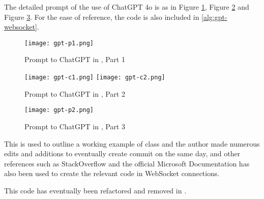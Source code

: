 The detailed prompt of the use of ChatGPT 4o \cite{gpt-websocket} is as in Figure \ref{fig:gpt-websocket-1}, Figure \ref{fig:gpt-websocket-2} and Figure \ref{fig:gpt-websocket-3}. For the ease of reference, the code is also included in \ref{alg:gpt-websocket}.

\begin{figure}[!ht]
    \centering

    \texttt{[image: gpt-p1.png]}
    \caption[Prompt to ChatGPT in \cite{gpt-websocket}, Part 1]{Prompt to ChatGPT in \cite{gpt-websocket}, Part 1}
    \label{fig:gpt-websocket-1}
\end{figure}

\begin{figure}[!ht]
    \centering

    \texttt{[image: gpt-c1.png]}
    \texttt{[image: gpt-c2.png]}
    
    \caption[Prompt to ChatGPT in \cite{gpt-websocket}, Part 2]{Prompt to ChatGPT in \cite{gpt-websocket}, Part 2}
    \label{fig:gpt-websocket-2}
\end{figure}

\begin{figure}[!ht]
    \centering

    \texttt{[image: gpt-p2.png]}
    
    \caption[Prompt to ChatGPT in \cite{gpt-websocket}, Part 3]{Prompt to ChatGPT in \cite{gpt-websocket}, Part 3}
    \label{fig:gpt-websocket-3}
\end{figure}

This is used to outline a working example of  class and the author made numerous edits and additions to eventually create commit  on the same day, and other references such as StackOverflow \cite{stackoverflow-websocket-demo}\cite{stackoverflow-websocket-demo-2} and the official Microsoft Documentation \cite{dotnet-ref-client-web-socket} has also been used to create the relevant code in WebSocket connections.

This code has eventually been refactored and removed in .


